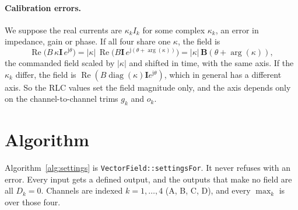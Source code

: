 \documentclass[11pt]{article}
\newcommand{\vb}[1]{\mathbf{#1}}
\newcommand{\jj}{\mathrm{j}}
\renewcommand{\Re}{\operatorname{Re}}
\begin{document}
\paragraph{Calibration errors.} We suppose the real currents are $\kappa_k I_k$ for some complex
$\kappa_k$, an error in impedance, gain or phase. If all four share one $\kappa$, the field is
\begin{equation}
  \Re\!\big(B\,\kappa\vb I\,e^{\jj\theta}\big) = |\kappa|\,\Re\!\big(B\vb I\,e^{\jj(\theta+\arg(\kappa))}\big)
  = |\kappa|\,\vb B(\theta+\arg(\kappa)),
\end{equation}
the commanded field scaled by $|\kappa|$ and shifted in time, with the same axis. If the
$\kappa_k$ differ, the field is $\Re(B\operatorname{diag}(\kappa)\vb I e^{\jj\theta})$, which in
general has a different axis. So the RLC values set the field magnitude only, and the axis depends
only on the channel-to-channel trims $g_k$ and $o_k$.

\section{Algorithm}

Algorithm~\ref{alg:settings} is \texttt{VectorField::settingsFor}. It never refuses with an
error. Every input gets a defined output, and the outputs that make no field are all
$D_k=0$. Channels are indexed $k=1,\dots,4$ (A, B, C, D), and every $\max_k$ is over those four.
\end{document}
